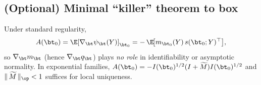 \subsection*{(Optional) Minimal “killer” theorem to box}
\begin{theorem}
Under standard regularity,
\[
A(\bt_0)=\E[\nabla_\bt\psi_\bt(Y)]_{\bt_0}
= -\,\E\!\big[m_{\bt_0}(Y)\,s(\bt_0;Y)^\top\big],
\]
so \(\nabla_\bt m_\bt\) (hence \(\nabla_\bt q_\bt\)) plays \emph{no role} in identifiability or asymptotic normality. In exponential families, \(A(\bt_0)=-I(\bt_0)^{1/2}(I+\widetilde M)I(\bt_0)^{1/2}\) and \(\|\,\widetilde M\,\|_{\op}<1\) suffices for local uniqueness.
\end{theorem}

